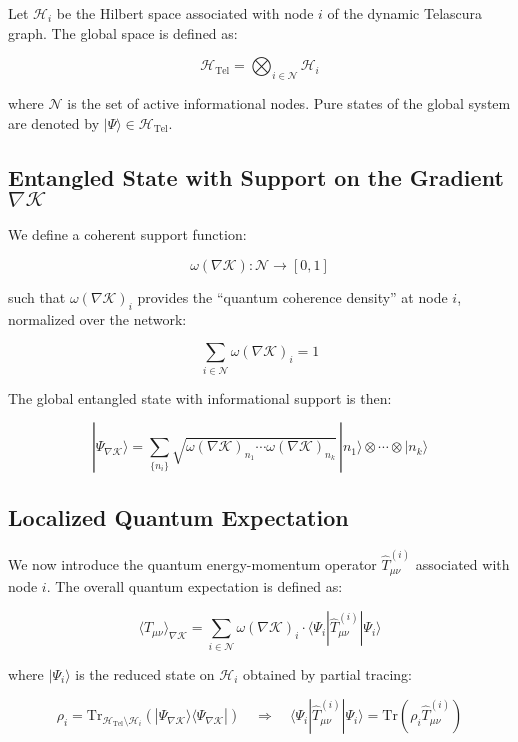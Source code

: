 \documentclass[12pt]{article}
\begin{document}
Let $\mathcal{H}_i$ be the Hilbert space associated with node $i$ of the dynamic Telascura graph. The global space is defined as:

\[
\mathcal{H}_{\text{Tel}} = \bigotimes_{i \in \mathcal{N}} \mathcal{H}_i
\]

where $\mathcal{N}$ is the set of active informational nodes. Pure states of the global system are denoted by $|\Psi\rangle \in \mathcal{H}_{\text{Tel}}$.

\subsection*{Entangled State with Support on the Gradient \texorpdfstring{$\nabla \mathcal{K}$}{∇K}}

We define a coherent support function:

\[
\omega(\nabla \mathcal{K}): \mathcal{N} \rightarrow [0,1]
\]

such that $\omega(\nabla \mathcal{K})_i$ provides the “quantum coherence density” at node $i$, normalized over the network:

\[
\sum_{i \in \mathcal{N}} \omega(\nabla \mathcal{K})_i = 1
\]

The global entangled state with informational support is then:

\[
|\Psi_{\nabla \mathcal{K}}\rangle = \sum_{\{n_i\}} \sqrt{\omega(\nabla \mathcal{K})_{n_1} \cdots \omega(\nabla \mathcal{K})_{n_k}} \, |n_1\rangle \otimes \cdots \otimes |n_k\rangle
\]
\subsection*{Localized Quantum Expectation}

We now introduce the quantum energy-momentum operator $\hat{T}_{\mu\nu}^{(i)}$ associated with node $i$. The overall quantum expectation is defined as:

\[
\langle \hat{T}_{\mu\nu} \rangle_{\nabla \mathcal{K}} = \sum_{i \in \mathcal{N}} \omega(\nabla \mathcal{K})_i \cdot \langle \Psi_i | \hat{T}_{\mu\nu}^{(i)} | \Psi_i \rangle
\]

where $|\Psi_i\rangle$ is the reduced state on $\mathcal{H}_i$ obtained by partial tracing:

\[
\rho_i = \mathrm{Tr}_{\mathcal{H}_{\text{Tel}} \setminus \mathcal{H}_i} \left( |\Psi_{\nabla \mathcal{K}}\rangle \langle \Psi_{\nabla \mathcal{K}}| \right)
\quad \Rightarrow \quad
\langle \Psi_i | \hat{T}_{\mu\nu}^{(i)} | \Psi_i \rangle = \mathrm{Tr}(\rho_i \hat{T}_{\mu\nu}^{(i)})
\]
\end{document}
